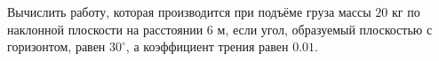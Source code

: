 Вычислить работу, которая производится при подъёме груза массы $20$ кг
по наклонной плоскости на расстоянии $6$ м, если угол, образуемый
плоскостью с горизонтом, равен $30^\circ$, а коэффициент трения равен
$0.01$.
